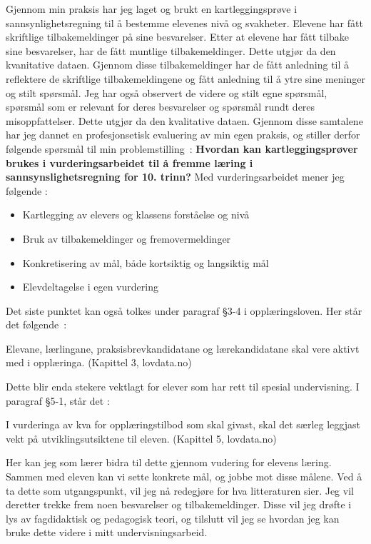 \documentclass[main.tex]{subfiles}
\begin{document}
Gjennom min praksis har jeg laget og brukt en kartleggingsprøve i sannsynlighetsregning til å bestemme
elevenes nivå og svakheter. Elevene har fått skriftlige tilbakemeldinger på sine besvarelser.
Etter at elevene har fått tilbake sine besvarelser, har de fått muntlige tilbakemeldinger. Dette utgjør da 
den kvanitative dataen. Gjennom disse tilbakemeldinger har de fått anledning til å reflektere
de skriftlige tilbakemeldingene og fått anledning til å ytre sine meninger og stilt spørsmål. Jeg har også
observert de videre og stilt egne spørsmål, spørsmål som er relevant for deres besvarelser og spørsmål
rundt deres misoppfattelser. Dette utgjør da den kvalitative dataen. Gjennom disse samtalene har jeg dannet 
en profesjonsetisk evaluering av min egen praksis, og stiller derfor følgende spørsmål til min 
\mbox{problemstilling :}
\newline
\newline
\textbf{Hvordan kan kartleggingsprøver brukes i vurderingsarbeidet til å fremme læring i 
        sannsynslighetsregning for 10. trinn?}
\newline
\newline
Med vurderingsarbeidet mener jeg følgende :
\begin{itemize}
\item Kartlegging av elevers og klassens forståelse og nivå
\item Bruk av tilbakemeldinger og fremovermeldinger
\item Konkretisering av mål, både kortsiktig og langsiktig mål
\item Elevdeltagelse i egen vurdering
\end{itemize}
Det siste punktet kan også tolkes under paragraf \S 3-4 i opplæringsloven. Her står det \mbox{følgende :}
\begin{displayquote}
Elevane, lærlingane, praksisbrevkandidatane og lærekandidatane skal vere aktivt med i opplæringa.
(Kapittel 3, lovdata.no)
\end{displayquote}
Dette blir enda stekere vektlagt for elever som har rett til spesial undervisning. I paragraf \S 5-1, står det :
\begin{displayquote}
I vurderinga av kva for opplæringstilbod som skal givast, skal det særleg leggjast vekt på utviklingsutsiktene til eleven.
(Kapittel 5, lovdata.no)
\end{displayquote}
Her kan jeg som lærer bidra til dette gjennom vudering for elevens læring. Sammen med eleven kan vi sette konkrete mål,
og jobbe mot disse målene. Ved å ta dette som utgangspunkt, vil jeg nå redegjøre for hva litteraturen sier.
Jeg vil deretter trekke frem noen besvarelser og tilbakemeldinger. Disse vil jeg drøfte i lys av fagdidaktisk og 
pedagogisk teori, og tilslutt vil jeg se hvordan jeg kan bruke dette videre i mitt undervisningsarbeid.
\end{document}
